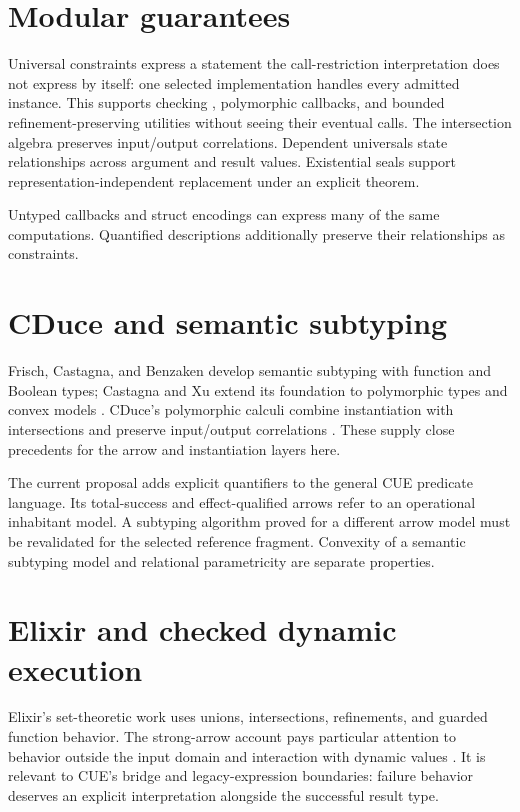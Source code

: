 \documentclass[11pt,a4paper,oneside]{report}
\newcommand{\code}[1]{\texttt{\detokenize{#1}}}
\theoremstyle{remark}
\begin{document}
\section{Modular guarantees}
Universal constraints express a statement the call-restriction interpretation
does not express by itself: one selected implementation handles every admitted
instance. This supports checking \code{map}, polymorphic callbacks, and bounded
refinement-preserving utilities without seeing their eventual calls. The
intersection algebra preserves input/output correlations. Dependent universals
state relationships across argument and result values. Existential seals support
representation-independent replacement under an explicit theorem.

Untyped callbacks and struct encodings can express many of the same
computations. Quantified descriptions additionally preserve their relationships
as constraints.

\section{CDuce and semantic subtyping}
Frisch, Castagna, and Benzaken develop semantic subtyping with function and
Boolean types; Castagna and Xu extend its foundation to polymorphic types and
convex models \cite{semantic,castagnaxu}. CDuce's polymorphic calculi combine
instantiation with intersections and preserve input/output correlations
\cite{poly1,poly2}. These supply close precedents for the arrow and instantiation
layers here.

The current proposal adds explicit quantifiers to the general CUE predicate
language. Its total-success and effect-qualified arrows refer to an operational
inhabitant model. A subtyping algorithm proved for a different arrow model must
be revalidated for the selected reference fragment. Convexity of a semantic
subtyping model and relational parametricity are separate properties.

\section{Elixir and checked dynamic execution}
Elixir's set-theoretic work uses unions, intersections, refinements, and guarded
function behavior. The strong-arrow account pays particular attention to
behavior outside the input domain and interaction with dynamic values
\cite{elixirstrong}. It is relevant to CUE's bridge and legacy-expression
boundaries: failure behavior deserves an explicit interpretation alongside the
successful result type.
\end{document}
